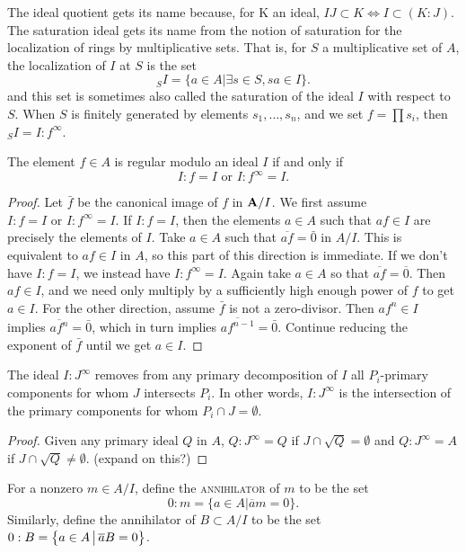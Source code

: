 \documentclass[12pt]{article}
\newcommand{\Emph}[1]{\textsc{#1}}
\begin{document}
\begin{remark}
The ideal quotient gets its name because, for K an ideal, $IJ\subset K \Leftrightarrow I\subset (K:J)$.  The saturation ideal gets its name from the notion of saturation for the localization of rings by multiplicative sets.  That is, for $S$ a multiplicative set of $A$, the localization of $I$ at $S$ is the set 
\[
_{S}I=\{a\in A| \exists s\in S, sa\in I\}. 
\]
and this set is sometimes also called the saturation of the ideal $I$ with respect to $S$.  When $S$ is finitely generated by elements $s_1,\ldots,s_n$, and we set $f=\prod s_i$, then $_SI=I:f^\infty$.
\end{remark}

\begin{proposition}
The element $f\in A$ is regular modulo an ideal $I$ if and only if 
\[
I:f = I \text{ or } I:f^\infty = I.
\]
\end{proposition}
\begin{proof}
Let $\bar f$ be the canonical image of $f$ in $\mathbf{A}/I$.  We first assume $I:f = I \text{ or } I:f^\infty = I$. If $I:f=I$, then the elements $a\in A$ such that $af\in I$ are precisely the elements of $I$.  Take $a\in A$ such that $\overline{af}=\bar0$ in $A/I$.  This is equivalent to $af \in I$ in $A$, so this part of this direction is immediate.  If we don't have $I:f=I$, we instead have $I:f^\infty=I$.  Again take $a\in A$ so that $\overline{af}=\overline{0}$.  Then $af\in I$, and we need only multiply by a sufficiently high enough power of $f$ to get $a\in I$.  For the other direction, assume $\bar f$ is not a zero-divisor.  Then $af^n\in I$ implies $\overline{af^n}=\bar0$, which in turn implies $\overline{af^{n-1}}=\bar0$.  Continue reducing the exponent of $\bar f$ until we get $a\in I$.
\end{proof}



\begin{proposition}
The ideal $I:J^\infty$ removes from any primary decomposition of $I$ all $P_i$-primary components for whom $J$ intersects $P_i$.  In other words, $I:J^\infty$ is the intersection of the primary components for whom $P_i\cap J=\emptyset$.
\end{proposition}
\begin{proof}
Given any primary ideal $Q$ in $A$, $Q:J^\infty=Q$ if $J\cap\sqrt{Q}=\emptyset$ and $Q:J^\infty=A$ if $J\cap\sqrt{Q}\neq\emptyset$. (expand on this?)
\end{proof}

\begin{definition}[annihilator]
For a nonzero $m\in A/I$, define the \Emph{annihilator} of $m$ to be the set
\[
0:m=\{a\in A| \overline am=0\}.
\]
Similarly, define the annihilator of $B\subset A/I$ to be the set $0:B=\left\{ a\in A \, \big{|} \, \overline aB=0 \right\}$.
\end{definition}
\end{document}
